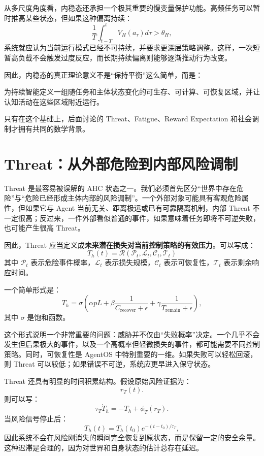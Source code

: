 从多尺度角度看，内稳态还承担一个极其重要的慢变量保护功能。高频任务可以暂时推高某些状态，但如果这种偏离持续：
\[
\frac{1}{T}
\int_{t-T}^{t}
V_H(a_\tau)d\tau
>
\theta_H,
\]
系统就应认为当前运行模式已经不可持续，并要求更深层策略调整。这样，一次短暂高负载不会触发过度反应，而长期持续偏离则能够逐渐推动行为改变。

因此，内稳态的真正理论意义不是“保持平衡”这么简单，而是：
\begin{statementbox}
为持续智能定义一组随任务和主体状态变化的可生存、可计算、可恢复区域，并让认知活动在这些区域附近运行。
\end{statementbox}
只有在这个基础上，后面讨论的 Threat、Fatigue、Reward Expectation 和社会调制才拥有共同的数学背景。

\section{Threat：从外部危险到内部风险调制}

Threat 是最容易被误解的 AHC 状态之一。我们必须首先区分“世界中存在危险”与“危险已经形成主体内部的风险调制”。一个外部对象可能具有客观危险属性，但如果它与 Agent 当前无关、距离极远或已有可靠隔离机制，内部 Threat 不一定很高；反过来，一件外部看似普通的事件，如果意味着任务即将不可逆失败，也可能产生很高 Threat。

因此，Threat 应当定义成\textbf{未来潜在损失对当前控制策略的有效压力}。可以写成：
\[
\boxed{
T_h(t)
=
\mathcal R
\left(
\mathcal P_t,
\mathcal L_t,
\mathcal C_t,
\mathcal T_t
\right)
}
\]
其中 \(\mathcal P_t\) 表示危险事件概率，\(\mathcal L_t\) 表示损失规模，\(\mathcal C_t\) 表示可恢复性，\(\mathcal T_t\) 表示剩余响应时间。

一个简单形式是：
\[
T_h
=
\sigma
\left(
\alpha pL
+
\beta \frac{1}{C_{\mathrm{recover}}+\epsilon}
+
\gamma \frac{1}{T_{\mathrm{remain}}+\epsilon}
\right),
\]
其中 \(\sigma\) 是饱和函数。

这个形式说明一个非常重要的问题：威胁并不仅由“失败概率”决定。一个几乎不会发生但后果极大的事件，以及一个高概率但轻微损失的事件，都可能需要不同控制策略。同时，可恢复性是 AgentOS 中特别重要的一维。如果失败可以轻松回滚，则 Threat 可以较低；如果错误不可逆，系统应更早进入保守状态。

Threat 还具有明显的时间积累结构。假设原始风险证据为：
\[
r_T(t).
\]
则可以写：
\[
\tau_T \dot T_h
=
-T_h
+
\phi_T(r_T).
\]
当风险信号停止后：
\[
T_h(t)
=
T_h(t_0)
e^{-(t-t_0)/\tau_T},
\]
因此系统不会在风险刚消失的瞬间完全恢复到原状态，而是保留一定的安全余量。这种迟滞是合理的，因为对世界和自身状态的估计总存在延迟。

